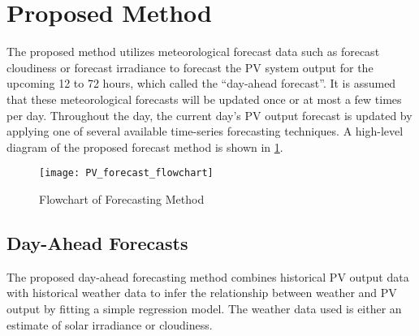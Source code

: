 \section{Proposed Method}
\label{sec:proposed-method}

The proposed method utilizes meteorological forecast data such as forecast cloudiness or forecast irradiance to forecast the PV system output for the upcoming 12 to 72 hours, which called the ``day-ahead forecast''.
It is assumed that these meteorological forecasts will be updated once or at most a few times per day.
Throughout the day, the current day's PV output forecast is updated by applying one of several available time-series forecasting techniques.
A high-level diagram of the proposed forecast method is shown in \cref{fig:PV_forecast_flowchart}.

\begin{figure}[ht]
	\centering
	\texttt{[image: PV\_forecast\_flowchart]}
	\caption{Flowchart of Forecasting Method}
	\label{fig:PV_forecast_flowchart}
\end{figure}


\subsection{Day-Ahead Forecasts}
\label{sec:method-day-ahead}

The proposed day-ahead forecasting method combines historical PV output data with historical weather data to infer the relationship between weather and PV output by fitting a simple regression model.
The weather data used is either an estimate of solar irradiance or cloudiness.

